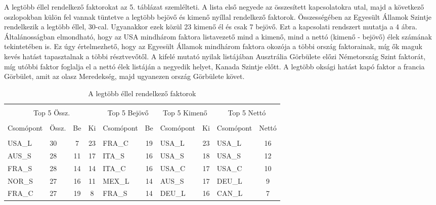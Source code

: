 \documentclass[12pt,bibliography=totoc]{article}
\begin{document}
A legtöbb éllel rendelkező faktorokat az 5. táblázat szemlélteti. A lista első negyede az összesített kapcsolatokra utal, majd a következő oszlopokban külön fel vannak tüntetve a legtöbb bejövő és kimenő nyíllal rendelkező faktorok. Összességében az Egyesült Államok Szintje rendelkezik a legtöbb éllel, 30-cal. Ugyanakkor ezek közül 23 kimenő él és csak 7 bejövő. Ezt a kapcsolati rendszert mutatja a 4 ábra. Általánosságban elmondható, hogy az USA mindhárom faktora listavezető mind a kimenő, mind a nettó (kimenő - bejövő) élek számának tekintetében is. Ez úgy értelmezhető, hogy az Egyesült Államok mindhárom faktora okozója a többi ország faktorainak, míg ők maguk kevés hatást tapasztalnak a többi résztvevőtől. A kifelé mutató nyilak listájában Ausztrália Görbülete előzi Németország Szint faktorát, míg utóbbi faktor foglalja el a nettó élek listáján a negyedik helyet, Kanada Szintje előtt. A legtöbb oksági hatást kapó faktor a francia Görbület, amit az olasz Meredekség, majd ugyanezen ország Görbülete követ.


\begin{table}[h]
\caption{A legtöbb éllel rendelkező faktorok} %
\fontsize{10}{10}\selectfont
\setlength{\tabcolsep}{10pt}
\centering%
\begin{tabular}{l  lcc  lc lc  lc}%

\hline\hline \\ [-1.5ex]                         %


\multicolumn{4}{c}{Top 5 Össz.}					&	\multicolumn{2}{c}{Top 5 Bejövő}			&	\multicolumn{2}{c}{Top 5 Kimenő}			&	\multicolumn{2}{c}{Top 5 Nettó}	\\	
\hline \\ [-1.5ex]    
Csomópont	&	Össz. 	&	Be	&	Ki	&	Csomópont	&	Be	&	Csomópont	&	Ki	&	Csomópont	&	Nettó	\\
\hline \\ [-1.5ex]    
USA\_L&	30	&	7	&	23	&	FRA\_C	&	19	&	USA\_L	&	23	&	USA\_L	&	16	\\
AUS\_S	&	28	&	11	&	17	&	ITA\_S	&	16	&	USA\_S	&	18	&	USA\_S	&	12	\\
FRA\_S	&	28	&	14	&	14	&	ITA\_C	&	16	&	USA\_C	&	17	&	USA\_C	&	10	\\
NOR\_S	&	27	&	16	&	11	&	MEX\_L	&	14	&	AUS\_S	&	17	&	DEU\_L	&	9	\\
FRA\_C	&	27	&	19	&	8	&	FRA\_S	&	14	&	DEU\_L	&	16	&	CAN\_L	&	7	\\

\hline            
\end{tabular}
\label{table:nonlin}%
\end{table}
\end{document}
